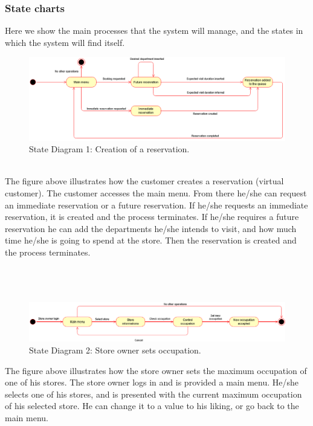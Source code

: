 \subsubsection{State charts}
Here we show the main processes that the system will manage, and the states in which the system will find itself.
\begin{figure}[!htb]
	\centering
	\includegraphics[width=\textwidth]{Images/StateDiagram.png}
	\caption{\label{fig:metamodel3}State Diagram 1: Creation of a reservation.}
\end{figure}\\
The figure above illustrates how the customer creates a reservation (virtual customer). The customer accesses the main menu. From there he/she can request an immediate reservation or a future reservation. If he/she requests an immediate reservation, it is created and the process terminates. If he/she requires a future reservation he can add the departments he/she intends to visit, and how much time he/she is going to spend at the store. Then the reservation is created and the process terminates.\\\\\\\\

\begin{figure}[!htb]
	\centering
	\includegraphics[width=\textwidth]{Images/StateDiagram2.png}
	\caption{State Diagram 2: Store owner sets occupation.}
\end{figure}
The figure above illustrates how the store owner sets the maximum occupation of one of his stores. The store owner logs in and is provided a main menu. He/she selects one of his stores, and is presented with the current maximum occupation of his selected store. He can change it to a value to his liking, or go back to the main menu.

